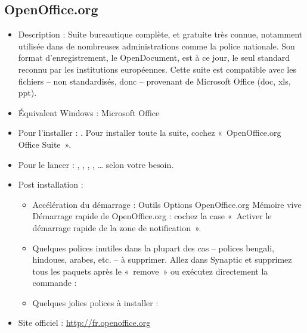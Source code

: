 \subsection{OpenOffice.org}
\label{RefInstallOOo}
\begin{itemize}
\begingroup
{}
\item Description : Suite bureautique complète,  et gratuite très connue, notamment utilisée dans de nombreuses administrations comme la police nationale. Son format d'enregistrement, le OpenDocument, est à ce jour, le seul standard reconnu par les institutions européennes. Cette suite est compatible avec les fichiers -- non standardisés, donc -- provenant de Microsoft Office (doc, xls, ppt).{\par}
\endgroup
\item Équivalent Windows : Microsoft Office{\par}
\item Pour l'installer : . Pour installer toute la suite, cochez «~OpenOffice.org Office Suite~».{\par}
\item Pour le lancer : , , , , \ldots{} selon votre besoin.{\par}
\item Post installation :{\par}
\begin{itemize}
\item Accélération du démarrage : Outils \FlecheDroite Options \FlecheDroite OpenOffice.org \FlecheDroite  Mémoire vive \FlecheDroite Démarrage rapide de OpenOffice.org : cochez la case «~Activer le démarrage rapide de la zone de notification~».
\item Quelques polices inutiles dans la plupart des cas -- polices bengali, hindoues, arabes, etc. -- à supprimer. Allez dans Synaptic et supprimez tous les paquets après le «~remove~» ou exécutez directement la commande : 
\item Quelques jolies polices à installer : 
\end{itemize}
\item Site officiel : \url{http://fr.openoffice.org}{\par}
\end{itemize}
